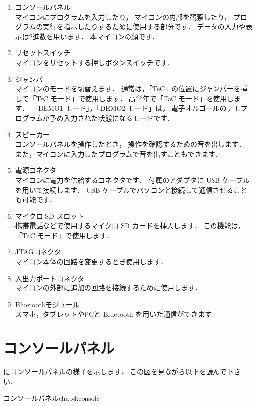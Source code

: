 \begin{enumerate}
\item コンソールパネル \\
  マイコンにプログラムを入力したり，
  マイコンの内部を観察したり，
  プログラムの実行を指示したりするために使用する部分です．
  データの入力や表示は2進数を用います．
  本マイコンの顔です．
\item リセットスイッチ \\
  マイコンをリセットする押しボタンスイッチです．
\item ジャンパ \\
  マイコンのモードを切替えます．
  通常は，「TeC」の位置にジャンパーを挿して「TeC モード」で使用します．
  高学年で「TaC モード」を使用します．
  「DEMO1 モード」，「DEMO2 モード」は，
  電子オルゴールのデモプログラムが予め入力された状態になるモードです．
\item スピーカー \\
  コンソールパネルを操作したとき，
  操作を確認するための音を出します．
  また，マイコンに入力したプログラムで音を出すこともできます．
\item 電源コネクタ \\
  マイコンに電力を供給するコネクタです．
  付属のアダプタに USB ケーブルを用いて接続します．
  USB ケーブルでパソコンと接続して通信させることも可能です．
\item マイクロ SD スロット \\
  携帯電話などで使用するマイクロ SD カードを挿入します．
  この機能は，「TaC モード」で使用します．
\item JTAGコネクタ \\
  マイコン本体の回路を変更するとき使用します．
\item 入出力ポートコネクタ \\
  マイコンの外部に追加の回路を接続するために使用します．
\item Bluetoothモジュール \\
  スマホ，タブレットやPCと Bluetooth を用いた通信ができます．
\end{enumerate}

\section{コンソールパネル}
にコンソールパネルの様子を示します．
この図を見ながら以下を読んで下さい．

           {コンソールパネル}{chap4:console}

